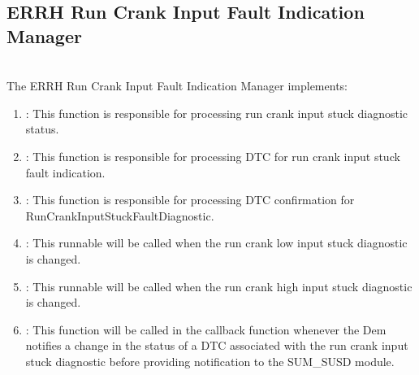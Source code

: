 \subsection{ERRH Run Crank Input Fault Indication Manager}
\label{subsec:ERRHRunCrankFault}
\\
The ERRH Run Crank Input Fault Indication Manager implements:
\begin{enumerate}
    \item {}: This function is responsible for processing run crank input stuck diagnostic status.
    \item {}: This function is responsible for processing DTC for run crank input stuck fault indication.
    \item {}: This function is responsible for processing DTC confirmation for RunCrankInputStuckFaultDiagnostic.
    \item {}: This runnable will be called when the run crank low input stuck diagnostic is changed.
    \item {}: This runnable will be called when the run crank high input stuck diagnostic is changed.
    \item {}: This function will be called in the callback function whenever the Dem notifies a change in the status of a DTC associated with the run crank input stuck diagnostic before providing notification to the SUM_SUSD module. 
\end{enumerate} 

{      }


